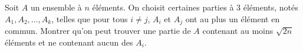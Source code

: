Soit $A$ un ensemble à $n$ éléments. On choisit certaines parties à $3$ éléments, notés $A_1, A_2, \ldots, A_k$, telles que pour tous $i \neq j$, $A_i$ et $A_j$ ont au plus un élément en commun. Montrer qu'on peut trouver une partie de $A$ contenant au moins $\sqrt{2n}$ éléments et ne contenant aucun des $A_i$.
